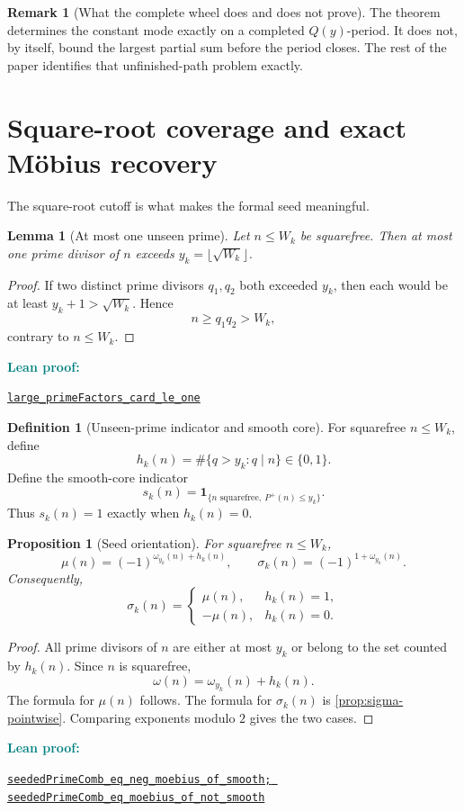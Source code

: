 \documentclass[11pt]{article}
\newtheorem{proposition}[theorem]{Proposition}
\newtheorem{lemma}[theorem]{Lemma}
\theoremstyle{definition}
\newtheorem{definition}[theorem]{Definition}
\newtheorem{remark}[theorem]{Remark}
\newcommand{\one}{\mathbf 1}
\newcommand{\leanxref}[3]{%
  \par\smallskip
  {\small\noindent\textcolor{teal}{\textbf{#1:}}\par
  \noindent\href{#3}{\nolinkurl{#2}}\par}
  \smallskip
}
\begin{document}
\begin{remark}[What the complete wheel does and does not prove]
The theorem determines the constant mode exactly on a completed $Q(y)$-period.  It does not, by itself, bound the largest partial sum before the period closes.  The rest of the paper identifies that unfinished-path problem exactly.
\end{remark}

\section{Square-root coverage and exact M\"obius recovery}

The square-root cutoff is what makes the formal seed meaningful.

\begin{lemma}[At most one unseen prime]\label{lem:one-large-prime}
Let $n\le W_k$ be squarefree.  Then at most one prime divisor of $n$ exceeds $y_k=\lfloor\sqrt{W_k}\rfloor$.
\end{lemma}

\begin{proof}
If two distinct prime divisors $q_1,q_2$ both exceeded $y_k$, then each would be at least $y_k+1>\sqrt{W_k}$.  Hence
\[
n\ge q_1q_2>W_k,
\]
contrary to $n\le W_k$.
\end{proof}
\leanxref{Lean proof}{large_primeFactors_card_le_one}{https://github.com/OVVO-Financial/prime-wheel-mobius/blob/main/formalization/RHLean/Arithmetic/PrimeWheelMobiusRecovery.lean}

\begin{definition}[Unseen-prime indicator and smooth core]\label{def:smooth-core}
For squarefree $n\le W_k$, define
\[
h_k(n)=\#\{q>y_k:q\mid n\}\in\{0,1\}.
\]
Define the smooth-core indicator
\[
s_k(n)=\one_{\{n\text{ squarefree},\ P^+(n)\le y_k\}}.
\]
Thus $s_k(n)=1$ exactly when $h_k(n)=0$.
\end{definition}

\begin{proposition}[Seed orientation]\label{prop:seed-orientation}
For squarefree $n\le W_k$,
\[
\mu(n)=(-1)^{\omega_{y_k}(n)+h_k(n)},
\qquad
\sigma_k(n)=(-1)^{1+\omega_{y_k}(n)}.
\]
Consequently,
\[
\sigma_k(n)=
\begin{cases}
\mu(n),&h_k(n)=1,\\
-\mu(n),&h_k(n)=0.
\end{cases}
\]
\end{proposition}

\begin{proof}
All prime divisors of $n$ are either at most $y_k$ or belong to the set counted by $h_k(n)$.  Since $n$ is squarefree,
\[
\omega(n)=\omega_{y_k}(n)+h_k(n).
\]
The formula for $\mu(n)$ follows.  The formula for $\sigma_k(n)$ is \cref{prop:sigma-pointwise}.  Comparing exponents modulo $2$ gives the two cases.
\end{proof}
\leanxref{Lean proof}{seededPrimeComb_eq_neg_moebius_of_smooth; seededPrimeComb_eq_moebius_of_not_smooth}{https://github.com/OVVO-Financial/prime-wheel-mobius/blob/main/formalization/RHLean/Arithmetic/PrimeWheelMobiusRecovery.lean}
\end{document}
